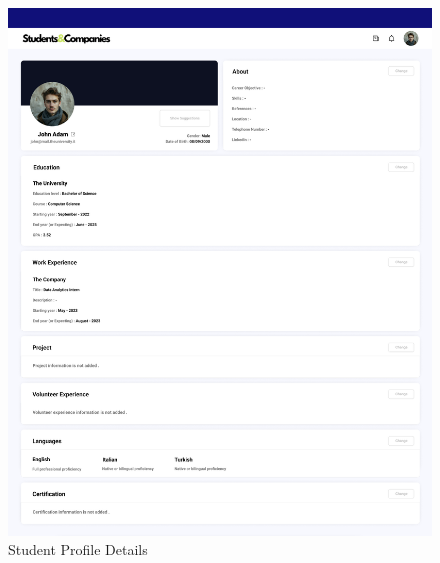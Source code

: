 \documentclass{article}
\begin{document}
\begin{figure}[H]
    \centering
    \includegraphics[scale = 0.35
    ]{figures/UserInterfaces/Student/Profile.png}
    \caption{Student Profile Details}
     \centering
\end{figure}
\end{document}
